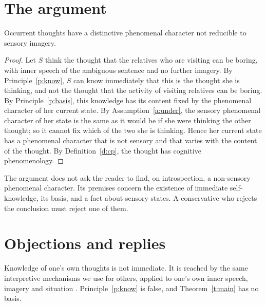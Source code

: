 \documentclass{situationist-preprint}
\begin{document}
\section{The argument}

\begin{theorem}\label{t:main}
Occurrent thoughts have a distinctive phenomenal character not reducible to sensory imagery.
\end{theorem}

\begin{proof}
Let $S$ think the thought that the relatives who are visiting can be boring, with inner speech of the ambiguous sentence and no further imagery. By Principle~\ref{p:know}, $S$ can know immediately that this is the thought she is thinking, and not the thought that the activity of visiting relatives can be boring. By Principle~\ref{p:basis}, this knowledge has its content fixed by the phenomenal character of her current state. By Assumption~\ref{a:under}, the sensory phenomenal character of her state is the same as it would be if she were thinking the other thought; so it cannot fix which of the two she is thinking. Hence her current state has a phenomenal character that is not sensory and that varies with the content of the thought. By Definition~\ref{d:cp}, the thought has cognitive phenomenology.
\end{proof}

The argument does not ask the reader to find, on introspection, a non-sensory phenomenal character. Its premises concern the existence of immediate self-knowledge, its basis, and a fact about sensory states. A conservative who rejects the conclusion must reject one of them.

\section{Objections and replies}

\begin{objection}[Interpretation]\label{o:isa}
Knowledge of one's own thoughts is not immediate. It is reached by the same interpretive mechanisms we use for others, applied to one's own inner speech, imagery and situation \citep{Carruthers2011}. Principle~\ref{p:know} is false, and Theorem~\ref{t:main} has no basis.
\end{objection}
\end{document}
